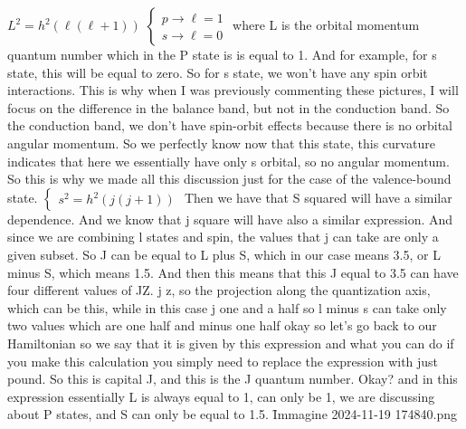 \(L^2=h^2\left(\ell\left(\ell+1\right)\right)\)
\(\begin{cases}
	p\rightarrow\ell=1\\
	s\rightarrow\ell=0
	\end{cases}\)
where L is the orbital momentum quantum number which in the P state is is equal to 1. And for example, for s state, this will be equal to zero. So for s state, we won't have any spin orbit interactions. This is why when I was previously commenting these pictures, I will focus on the difference in the balance band, but not in the conduction band. So the conduction band, we don't have spin-orbit effects because there is no orbital angular momentum. So we perfectly know now that this state, this curvature indicates that here we essentially have only s orbital, so no angular momentum. So this is why we made all this discussion just for the case of the valence-bound state.
\(\begin{cases}
	s^2=h^2\left(j\left(j+1\right)\right)
  \end{cases}
\)
Then we have that S squared will have a similar dependence. And we know that j square will have also a similar expression. And since we are combining l states and spin, the values that j can take are only a given subset. So J can be equal to L plus S, which in our case means 3.5, or L minus S, which means 1.5. And then this means that this J equal to 3.5 can have four different values of JZ. j z, so the projection along the quantization axis, which can be this, while in this case j one and a half so l minus s can take only two values which are one half and minus one half okay so let's go back to our Hamiltonian so we say that it is given by this expression and what you can do if you make this calculation you simply need to replace the expression with just pound. So this is capital J, and this is the J quantum number. Okay? and in this expression essentially L is always equal to 1, can only be 1, we are discussing about P states, and S can only be equal to 1.5.
\f{Immagine 2024-11-19 174840.png}
